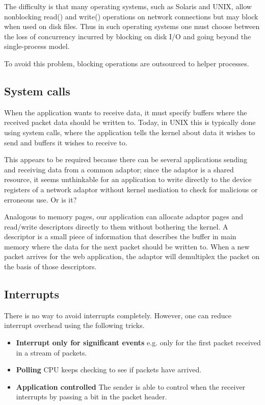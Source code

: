The difficulty is that many operating systems, such as Solaris and UNIX, allow nonblocking read() and write() operations on network connections but may block when used on disk
files. Thus in such operating systems one must choose between the loss of concurrency incurred by blocking on disk I/O and going beyond the single-process model.

To avoid this problem, blocking operations are outsourced to helper processes.



\subsection{System calls}

When the application wants to receive data, it must specify buffers where the received
packet data should be written to. Today, in UNIX this is typically done using system calls,
where the application tells the kernel about data it wishes to send and buffers it wishes to receive to.

This appears to be required because there can be several applications sending and receiving
data from a common adaptor; since the adaptor is a shared resource, it seems unthinkable for an application to write directly to the device registers of a network adaptor without kernel mediation to check for malicious or erroneous use. Or is it?

Analogous to memory pages, our application can allocate adaptor pages and read/write descriptors directly to them without bothering the kernel. A descriptor is a small piece of information that describes the buffer in main memory where the data for the next packet should be written to. When a new packet arrives for the web application, the adaptor will demultiplex the packet on the basis of those descriptors.


\subsection{Interrupts}

There is no way to avoid interrupts completely. However, one can reduce interrupt overhead using the following tricks.

\begin{itemize}
\item \textbf{Interrupt only for significant events} e.g. only for the first packet received in a stream of packets.

\item \textbf{Polling} CPU keeps checking to see if packets have arrived.

\item \textbf{Application controlled} The sender is able to control when the receiver interrupts by passing a bit in the packet header.
\end{itemize}
